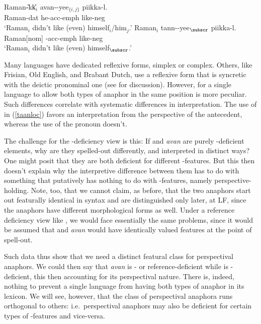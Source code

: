 \documentclass[output=paper, modfonts, nonflat]{langsci/langscibook}
\begin{document}
\ea\label{avanloc}\gll Raman-\U{}kk\U{}$_i$ avan-\AI{}-yee$_{\{i,j\}}$ pi\D ikka-l\E.\\
Raman-{\sc dat} he-{\sc acc-emph} like-{\sc neg}\\
\glt `Raman$_i$ didn't like (even) himself$_i$/him$_j$.'
\ex\label{taanloc}\gll Raman$_i$ tann-\AI{}-yee$_\subscr$ pi\D ikka-l\E.\\
Raman[{\sc nom}] \anaph-{\sc acc-emph} like-{\sc neg}\\
\glt `Raman$_i$ didn't like (even) himself$_\subscr$.'  \z

\noindent Many languages have dedicated reflexive forms, simplex or
complex. Others, like Frisian, Old English, and Brabant Dutch, use a
reflexive form that is syncretic with the deictic pronominal one (see
\citealt{roorwyn:2011} for discussion). However, for a single language
to allow both types of anaphor in the same position is more
peculiar. Such differences correlate with systematic differences in
interpretation. The use of \taan{} in (\ref{taanloc}) \taan{} favors
an interpretation from the perspective of the antecedent, whereas the
use of the pronoun doesn't.

The challenge for the \ph-deficiency view is this: If \taan{} and
\textit{avan} are purely \ph-deficient elements, why are they
spelled-out differently, and interpreted in distinct ways?  One might
posit that they are both deficient for different \ph-features. But
this then doesn't explain why the interpretive difference between them
has to do with something that putatively has nothing to do with
\ph-features, namely perspective-holding. Note, too, that we cannot
claim, as before, that the two anaphors start out featurally identical
in syntax and are distinguished only later, at LF, since the anaphors
have different morphological forms as well. Under a reference
deficiency view like \citet{Hicks:2009}, we would face essentially the
same problems, since it would be assumed that \taan{} and
\textit{avan} would have identically valued \var{} features at the
point of spell-out.

Such data thus show that we need a distinct featural class for
perspectival anaphors. We could then say that \textit{avan} is \ph- or
reference-deficient while \taan{} is \dep-deficient, this then
accounting for its perspectival nature. There is, indeed, nothing to
prevent a single language from having both types of anaphor in its
lexicon. We will see, however, that the class of perspectival anaphora
runs orthogonal to others: i.e.\ perspectival anaphors may also be
deficient for certain types of \ph-features and vice-versa.
\end{document}
